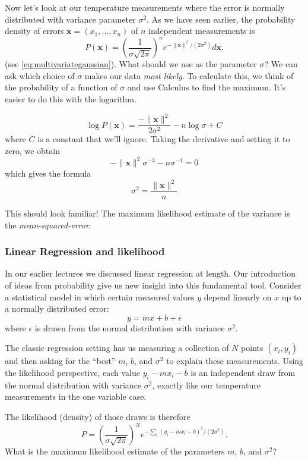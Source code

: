 \documentclass[
]{article}
\begin{document}
Now let's look at our temperature measurements where the error is
normally distributed with variance parameter \(\sigma^2\). As we have
seen earlier, the probability density of errors
\(\mathbf{x}=(x_1,\ldots,x_n)\) of \(n\) independent measurements is \[
P(\mathbf{x}) = \left(\frac{1}{\sigma\sqrt{2\pi}}\right)^{n}e^{-\|\mathbf{x}\|^2/(2\sigma^2)}d\mathbf{x}.
\] (see \cref{eq:multivariategaussian}). What should we use as the
parameter \(\sigma\)? We can ask which choice of \(\sigma\) makes our
data \emph{most likely}. To calculate this, we think of the probability
of a function of \(\sigma\) and use Calculus to find the maximum. It's
easier to do this with the logarithm.

\[
\log P(\mathbf{x})=\frac{-\|\mathbf{x}\|^2}{2\sigma^2}-n\log{\sigma}+C
\] where \(C\) is a constant that we'll ignore. Taking the derivative
and setting it to zero, we obtain \[
-\|\mathbf{x}\|^2\sigma^{-3}-n\sigma^{-1}=0
\] which gives the formula \[
\sigma^2=\frac{\|\mathbf{x}\|^2}{n}
\]

This should look familiar! The maximum likelihood estimate of the
variance is the \emph{mean-squared-error}.

\hypertarget{linear-regression-and-likelihood}{%
\subsubsection{Linear Regression and
likelihood}\label{linear-regression-and-likelihood}}

In our earlier lectures we discussed linear regression at length. Our
introduction of ideas from probability give us new insight into this
fundamental tool. Consider a statistical model in which certain measured
values \(y\) depend linearly on \(x\) up to a normally distributed
error: \[
y=mx+b+\epsilon
\] where \(\epsilon\) is drawn from the normal distribution with
variance \(\sigma^2\).

The classic regression setting has us measuring a collection of \(N\)
points \((x_i,y_i)\) and then asking for the ``best'' \(m\), \(b\), and
\(\sigma^2\) to explain these measurements. Using the likelihood
perspective, each value \(y_i-mx_i-b\) is an independent draw from the
normal distribution with variance \(\sigma^2\), exactly like our
temperature measurements in the one variable case.

The likelihood (density) of those draws is therefore \[
P = \left(\frac{1}{\sigma\sqrt{2\pi}}\right)^Ne^{-\sum_{i}(y_i-mx_i-b)^2/(2\sigma^2)}.
\] What is the maximum likelihood estimate of the parameters \(m\),
\(b\), and \(\sigma^2\)?
\end{document}
